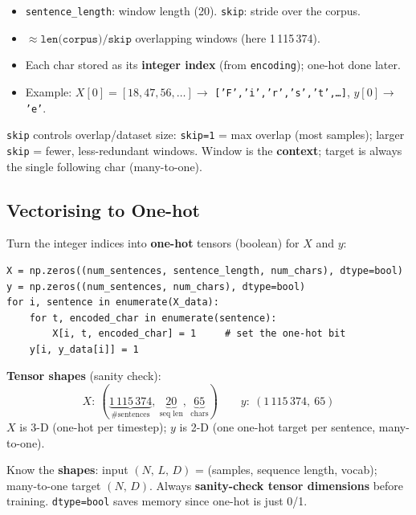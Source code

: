 \documentclass[10pt,a4paper]{article}
\begin{document}
	\begin{itemize}[leftmargin=*]
		\item \texttt{sentence\_length}: window length (20). \quad \texttt{skip}: stride over the corpus.
		\item $\approx \texttt{len(corpus)}/\texttt{skip}$ overlapping windows (here 1\,115\,374).
		\item Each char stored as its \textbf{integer index} (from \texttt{encoding}); one-hot done later.
		\item Example: $X[0]=[18,47,56,\dots]\to$ \texttt{['F','i','r','s','t',\dots]}, \; $y[0]\to$ \texttt{'e'}.
	\end{itemize}

	\begin{importantbox}
		\texttt{skip} controls overlap/dataset size: \texttt{skip=1} = max overlap (most samples); larger \texttt{skip} = fewer, less-redundant windows. Window is the \textbf{context}; target is always the single following char (many-to-one).
	\end{importantbox}

	\subsection{Vectorising to One-hot}

	Turn the integer indices into \textbf{one-hot} tensors (boolean) for $X$ and $y$:

	\begin{verbatim}
X = np.zeros((num_sentences, sentence_length, num_chars), dtype=bool)
y = np.zeros((num_sentences, num_chars), dtype=bool)
for i, sentence in enumerate(X_data):
    for t, encoded_char in enumerate(sentence):
        X[i, t, encoded_char] = 1     # set the one-hot bit
    y[i, y_data[i]] = 1
	\end{verbatim}

	\begin{importantbox}
		\textbf{Tensor shapes} (sanity check):
		\[
		X:\ (\underbrace{1\,115\,374}_{\text{\#sentences}},\ \underbrace{20}_{\text{seq len}},\ \underbrace{65}_{\text{chars}}) \qquad
		y:\ (1\,115\,374,\ 65)
		\]
		$X$ is 3-D (one-hot per timestep); $y$ is 2-D (one one-hot target per sentence, many-to-one).
	\end{importantbox}

	\begin{examtipbox}
		Know the \textbf{shapes}: input $(N,\,L,\,D)$ = (samples, sequence length, vocab); many-to-one target $(N,\,D)$. Always \textbf{sanity-check tensor dimensions} before training. \texttt{dtype=bool} saves memory since one-hot is just 0/1.
	\end{examtipbox}
\end{document}
